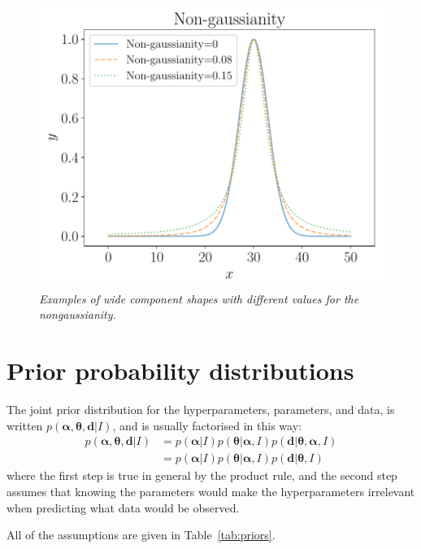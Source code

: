 \documentclass[a4paper, 12pt]{article}
\newcommand{\hypers}{\boldsymbol{\alpha}}
\newcommand{\params}{\boldsymbol{\theta}}
\newcommand{\data}{\boldsymbol{d}}
\newcommand{\info}{I}
\begin{document}
\begin{figure}[!ht]
\centering
\includegraphics[scale=0.7]{figures/nongaussianity.pdf}
\caption{\it Examples of wide component shapes with different values
for the nongaussianity.\label{fig:nongaussianity}}
\end{figure}

\section{Prior probability distributions}\label{sec:priors}
The joint prior distribution for the hyperparameters, parameters, and data,
is written $p(\hypers, \params, \data | \info)$, and is usually factorised
in this way:
\begin{align}
p(\hypers, \params, \data | \info) &=
    p(\hypers | \info)p(\params | \hypers, \info)
    p(\data | \params, \hypers, \info)\\
    &= p(\hypers | \info)p(\params | \hypers, \info)
    p(\data | \params, \info)
\end{align}
where the first step is true in general by the product rule, and the second
step assumes that knowing the parameters would make the hyperparameters
irrelevant when predicting what data would be observed.

All of the assumptions are given in Table~\ref{tab:priors}.
\end{document}
